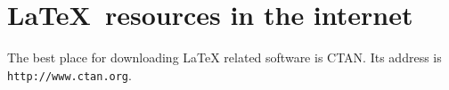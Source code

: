 \documentclass{article}
\begin{document}
\section{\textsf{\LaTeX\ resources in the internet}}
The best place for downloading LaTeX related software is CTAN.
Its address is \texttt{http://www.ctan.org}.
\end{document}
